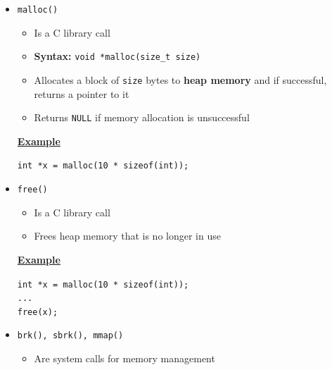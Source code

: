 \documentclass[12pt]{article}
\begin{document}
\begin{enumerate}[1.]
\begin{enumerate}[a)]
\begin{itemize}
\begin{itemize}
                \item \texttt{malloc()}
                \begin{itemize}
                    \item Is a C library call
                    \item \textbf{Syntax:} \texttt{void *malloc(size\_t size)}
                    \item Allocates a block of \texttt{size} bytes to \textbf{heap memory}
                    and if successful, returns a pointer to it
                    \item Returns \texttt{NULL} if memory allocation is unsuccessful
                \end{itemize}

                \bigskip

                \underline{\textbf{Example}}

                \bigskip

                \texttt{int *x = malloc(10 * sizeof(int));}

                \bigskip
                \item \texttt{free()}
                \begin{itemize}
                    \item Is a C library call
                    \item Frees heap memory that is no longer in use
                \end{itemize}

                \bigskip

                \underline{\textbf{Example}}

                \bigskip

                \texttt{int *x = malloc(10 * sizeof(int));}\\
                \texttt{...}\\
                \texttt{free(x);}

                \bigskip

                \item \texttt{brk(), sbrk(), mmap()}

                \begin{itemize}
                    \item Are system calls for memory management
                \end{itemize}

            \end{itemize}


\end{itemize}
\end{enumerate}
\end{enumerate}
\end{document}
